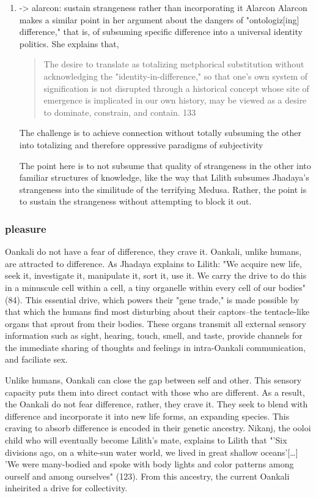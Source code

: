 \documentclass[11pt]{article}
\begin{document}
\begin{enumerate}
\item -> alarcon: sustain strangeness rather than incorporating it
\label{sec:org2672955}
Alarcon Alarcon makes a similar point in her argument about the
dangers of "ontologiz[ing] difference," that is, of subsuming specific
difference into a universal identity politics. She explains that,
\begin{quote}
The desire to translate as totalizing metphorical substitution without
acknowledging the "identity-in-difference," so that one's own system
of signification is not disrupted through a historical concept whose
site of emergence is implicated in our own history, may be viewed as
a desire to dominate, constrain, and contain. 133 
\end{quote}
The challenge is to achieve connection without totally subsuming the
other into totalizing and therefore oppressive paradigms of
subjectivity 

The point here is to not subsume that quality of strangeness in the
  other into familiar structures of knowledge, like the way that
  Lilith subsumes Jhadaya's strangeness into the similitude of the
  terrifying Medusa. Rather, the point is to sustain the strangeness
  without attempting to block it out.
\end{enumerate}

\subsubsection{pleasure}
\label{sec:orgf27a22c}
Oankali do not have a fear of difference, they crave it.  Oankali,
unlike humans, are attracted to difference. As Jhadaya explains to
Lilith: "We acquire new life, seek it, investigate it, manipulate it,
sort it, use it. We carry the drive to do this in a minuscule cell
within a cell, a tiny organelle within every cell of our bodies"
(84). This essential drive, which powers their "gene trade," is made
possible by that which the humans find most disturbing about their
captors--the tentacle-like organs that sprout from their bodies. These
organs transmit all external sensory information such as sight,
hearing, touch, smell, and taste, provide channels for the immediate
sharing of thoughts and feelings in intra-Oankali communication, and
faciliate sex.

Unlike humans, Oankali can close the gap between self and other. This
sensory capacity puts them into direct contact with those who are
different. As a result, the Oankali do not fear difference, rather,
they crave it. They seek to blend with difference and incorporate it
into new life forms, an expanding species. This craving to absorb
difference is encoded in their genetic ancestry. Nikanj, the ooloi
child who will eventually become Lilith's mate, explains to Lilith
that "'Six divisions ago, on a white-sun water world, we lived in
great shallow oceans'[\ldots{}] 'We were many-bodied and spoke with body
lights and color patterns among ourself and among ourselves"
(123). From this ancestry, the current Oankali inheirited a drive for
collectivity.
\end{document}
